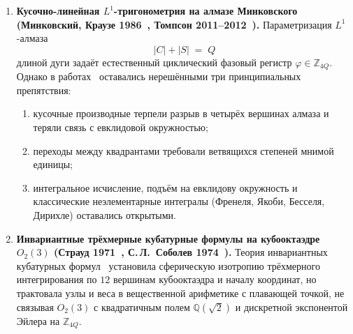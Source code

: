 \documentclass[11pt,a4paper]{article}
\theoremstyle{plain}
\theoremstyle{definition}
\begin{document}
\begin{enumerate}[label=\textbf{(\arabic*)},leftmargin=*]
\item \textbf{Кусочно-линейная $L^1$-тригонометрия на алмазе Минковского (Минковский, Краузе 1986~\cite{Krause1986}, Томпсон 2011--2012~\cite{Thompson2011,Thompson2012}).}
  Параметризация $L^1$-алмаза
  \begin{equation}
    \label{eq:intro-l1-diamond}
    |C| + |S| \;=\; Q
  \end{equation}
  длиной дуги задаёт естественный циклический фазовый регистр $\varphi \in \mathbb{Z}_{4Q}$. Однако в работах~\cite{Thompson2011,Thompson2012} оставались нерешёнными три принципиальных препятствия:
  \begin{enumerate}[label=(\alph*)]
  \item кусочные производные терпели разрыв в четырёх вершинах алмаза и теряли связь с евклидовой окружностью;
  \item переходы между квадрантами требовали ветвящихся степеней мнимой единицы;
  \item интегральное исчисление, подъём на евклидову окружность и классические неэлементарные интегралы (Френеля, Якоби, Бесселя, Дирихле) оставались открытыми.
  \end{enumerate}

\item \textbf{Инвариантные трёхмерные кубатурные формулы на кубооктаэдре $O_2(3)$ (Страуд 1971~\cite{Stroud1971}, С.\,Л.~Соболев 1974~\cite{Sobolev1974}).}
  Теория инвариантных кубатурных формул~\cite{Sobolev1974,Stroud1971} установила сферическую изотропию трёхмерного интегрирования по $12$ вершинам кубооктаэдра и началу координат, но трактовала узлы и веса в вещественной арифметике с плавающей точкой, не связывая $O_2(3)$ с квадратичным полем $\mathbb{Q}(\sqrt{2})$ и дискретной экспонентой Эйлера на $\mathbb{Z}_{4Q}$.
\end{enumerate}
\end{document}
